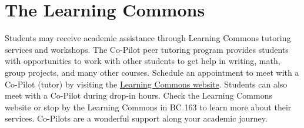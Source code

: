 \documentclass[
  letterpaper,
  DIV=11,
  numbers=noendperiod]{scrreprt}
\begin{document}
\section{The Learning Commons}\label{the-learning-commons}

Students may receive academic assistance through Learning Commons
tutoring services and workshops. The Co-Pilot peer tutoring program
provides students with opportunities to work with other students to get
help in writing, math, group projects, and many other courses. Schedule
an appointment to meet with a Co-Pilot (tutor) by visiting the
\href{https://www.up.edu/learningcommons}{Learning Commons website}.
Students can also meet with a Co-Pilot during drop-in hours. Check the
Learning Commons website or stop by the Learning Commons in BC 163 to
learn more about their services. Co-Pilots are a wonderful support along
your academic journey.
\end{document}
